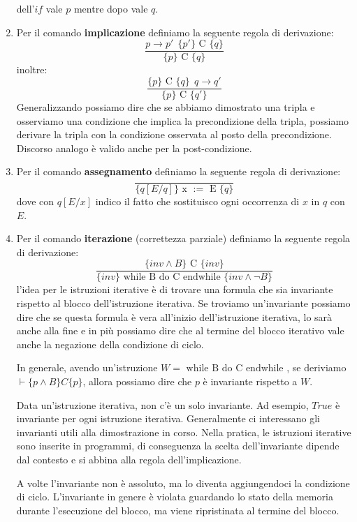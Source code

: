 \begin{enumerate}
          dell'$if$ vale $p$ mentre dopo vale $q$.
    \item Per il comando \textbf{implicazione} definiamo la seguente regola di
          derivazione:
          \begin{equation}
              \frac{p \to p' \ \ \{p'\} \text{ C } \{q\}}{\{p\} \text{ C } \{q\}}
          \end{equation}
          inoltre:
          \begin{equation}
              \frac{\{p\} \text{ C } \{q\} \ \ q \to q'}{\{p\} \text{ C } \{q'\}}
          \end{equation}
          Generalizzando possiamo dire che se abbiamo dimostrato una tripla e
          osserviamo una condizione che implica la precondizione della tripla,
          possiamo derivare la tripla con la condizione osservata al posto della
          precondizione. Discorso analogo è valido anche per la post-condizione.
    \item Per il comando \textbf{assegnamento} definiamo la seguente regola di derivazione:
          \begin{equation}
              \frac{}{\{q[E/q]\} \text{ x } := \text{ E }\{q\}}
          \end{equation}
          dove con $q[E / x]$ indico il fatto che sostituisco ogni occorrenza di
          $x$ in $q$ con $E$.
    \item Per il comando \textbf{iterazione} (correttezza parziale) definiamo la
          seguente regola di derivazione:
          \begin{equation}
              \frac{\{inv \land B\} \text{ C } \{inv\}}{\{inv\} \text{ while B do C endwhile } \{inv \land \lnot B\}}
          \end{equation}
          l'idea per le istruzioni iterative è di trovare una formula che sia
          invariante rispetto al blocco dell'istruzione iterativa. Se troviamo
          un'invariante possiamo dire che se questa formula è vera all'inizio
          dell'istruzione iterativa, lo sarà anche alla fine e in più possiamo
          dire che al termine del blocco iterativo vale anche la negazione della
          condizione di ciclo.

          In generale, avendo un'istruzione $W = \text{ while B do C endwhile }$,
          se deriviamo $\vdash \{p \land B\} C \{p\}$, allora possiamo dire che
          $p$ è invariante rispetto a $W$.

          Data un'istruzione iterativa, non c'è un solo invariante. Ad esempio,
          $True$ è invariante per ogni istruzione iterativa. Generalmente ci
          interessano gli invarianti utili alla dimostrazione in corso. Nella
          pratica, le istruzioni iterative sono inserite in programmi, di conseguenza
          la scelta dell'invariante dipende dal contesto e si abbina alla regola
          dell'implicazione.

          A volte l'invariante non è assoluto, ma lo diventa aggiungendoci la
          condizione di ciclo. L'invariante in genere è violata guardando lo
          stato della memoria durante l'esecuzione del blocco, ma viene ripristinata
          al termine del blocco.
\end{enumerate}

